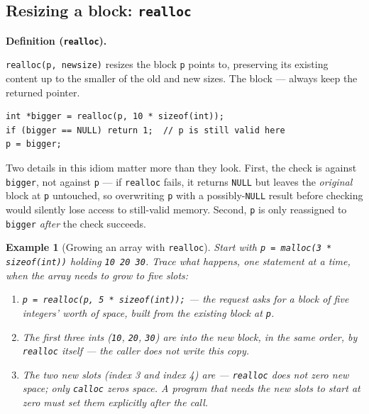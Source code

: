 \documentclass[11pt]{article}
\newtheorem{example}{Example}[section]
\newenvironment{definitionbox}[1]{%
  \par\noindent\textbf{Definition (#1).}\ \itshape
}{\par\vspace{0.3em}}
\begin{document}
\subsection{Resizing a block: \texttt{realloc}}

\begin{definitionbox}{\texttt{realloc}}
\texttt{realloc(p, newsize)} resizes the block \texttt{p} points to,
preserving its existing content up to the smaller of the old and new sizes.
The block  --- always keep the returned pointer.
\end{definitionbox}

{\footnotesize
\begin{verbatim}
int *bigger = realloc(p, 10 * sizeof(int));
if (bigger == NULL) return 1;  // p is still valid here
p = bigger;
\end{verbatim}
}
Two details in this idiom matter more than they look. First, the check is
against \texttt{bigger}, not against \texttt{p} --- if \texttt{realloc} fails,
it returns \texttt{NULL} but leaves the \emph{original} block at \texttt{p}
untouched, so overwriting \texttt{p} with a possibly-\texttt{NULL} result
before checking would silently lose access to still-valid memory. Second,
\texttt{p} is only reassigned to \texttt{bigger} \emph{after} the check
succeeds.

\begin{example}[Growing an array with \texttt{realloc}]
Start with \texttt{p = malloc(3 * sizeof(int))} holding \texttt{10 20 30}.
Trace what happens, one statement at a time, when the array needs to grow to
five slots:
\begin{enumerate}
  \item \texttt{p = realloc(p, 5 * sizeof(int));} --- the request asks for a
    block of five integers' worth of space, built from the existing block at
    \texttt{p}.
  \item The first three ints (\texttt{10}, \texttt{20}, \texttt{30}) are
     into the new block, in the same order, by \texttt{realloc}
    itself --- the caller does not write this copy.
  \item The two new slots (index 3 and index 4) are  ---
    \texttt{realloc} does not zero new space; only \texttt{calloc} zeros
    space. A program that needs the new slots to start at zero must set them
    explicitly after the call.
\end{enumerate}
\end{example}
\end{document}
